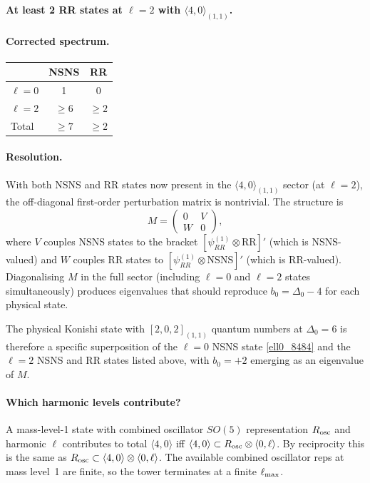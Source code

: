 \documentclass[12pt]{article}
\def\be{\begin{equation}}
\def\ee{\end{equation}}
\newcommand{\D}{\ensuremath{\Delta}}
\begin{document}
\smallskip
\noindent\textbf{At least 2 RR states at $\ell=2$ with $\langle 4,0\rangle_{(1,1)}$.}

\paragraph{Corrected spectrum.}
\begin{center}
\begin{tabular}{|l|c|c|}
\hline
& NSNS & RR \\
\hline
$\ell=0$ & 1 & 0 \\
$\ell=2$ & $\geq 6$ & $\geq 2$ \\
\hline
Total & $\geq 7$ & $\geq 2$ \\
\hline
\end{tabular}
\end{center}

\paragraph{Resolution.}
With both NSNS and RR states now present in the $\langle 4,0\rangle_{(1,1)}$ sector
(at $\ell=2$), the off-diagonal first-order perturbation matrix is nontrivial.
The structure is
\be
M=\begin{pmatrix}
0 & V \\ W & 0
\end{pmatrix},
\ee
where $V$ couples NSNS states to the bracket $[\psi^{(1)}_{RR}\otimes\text{RR}]'$
(which is NSNS-valued) and $W$ couples RR states to
$[\psi^{(1)}_{RR}\otimes\text{NSNS}]'$ (which is RR-valued).
Diagonalising $M$ in the full sector
(including $\ell=0$ and $\ell=2$ states simultaneously) produces eigenvalues that should
reproduce $b_0=\D_0-4$ for each physical state.

The physical Konishi state with $[2,0,2]_{(1,1)}$ quantum numbers at $\D_0=6$ is therefore
a specific superposition of the $\ell=0$ NSNS state \eqref{ell0_8484} and the $\ell=2$ NSNS
and RR states listed above, with $b_0=+2$ emerging as an eigenvalue of $M$.

\paragraph{Which harmonic levels contribute?}
A mass-level-1 state with combined oscillator $SO(5)$ representation $R_{\rm osc}$ and
harmonic $\ell$ contributes to total $\langle 4,0\rangle$ iff
$\langle 4,0\rangle\subset R_{\rm osc}\otimes\langle 0,\ell\rangle$.
By reciprocity this is the same as $R_{\rm osc}\subset\langle 4,0\rangle\otimes\langle 0,\ell\rangle$.
The available combined oscillator reps at mass level~1 are finite, so the tower terminates at
a finite $\ell_{\rm max}$.
\end{document}
